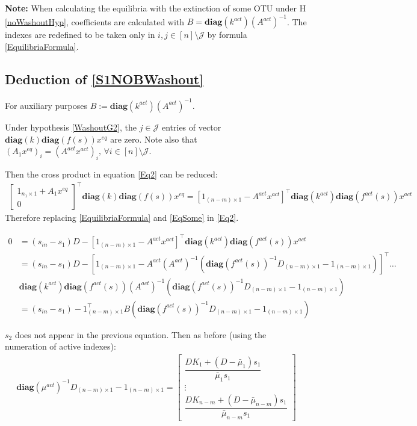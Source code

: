 \documentclass[3p,times]{article}
\newcommand{\diag}{\textbf{diag}}
\begin{document}
\textbf{Note:} When calculating the equilibria with the extinction of some OTU under H \ref{noWashoutHyp}, coefficients are calculated with $B = \diag(k^{act})(A^{act})^{-1}$. The indexes are redefined to be taken only in $i,j \in [n] \setminus \mathcal{J}$ by formula \eqref{EquilibriaFormula}.

\subsection{Deduction of \eqref{S1NOBWashout}}
For auxiliary purposes $B:= \diag(k^{act})(A^{act})^{-1}$. 

Under hypothesis \ref{WashoutG2}, the $j \in \mathcal{J}$ entries of vector $\diag(k) \diag(f(s))x^{eq} $ are zero. 
Note also that $(A_1x^{eq})_i = (A^{act}x^{act})_i, \, \forall i \in [n] \setminus \mathcal{J}$.

Then the cross product in equation \eqref{Eq2} can be reduced:
\begin{align} 
\begin{bmatrix}
1_{n_1\times 1}+A_1x^{eq} \\0
\end{bmatrix}^\top \diag(k) \diag(f(s))x^{eq} = [1_{(n-m)\times 1} - A^{act}x^{act}]^\top \diag(k^{act}) \diag(f^{act}(s))x^{act} 
\end{align} 
Therefore replacing \eqref{EquilibriaFormula} and \eqref{EqSome} in \eqref{Eq2}.

\begin{align}
0 &= (s_{in}-s_1)D- [1_{(n-m)\times 1} - A^{act}x^{act}]^\top \diag(k^{act}) \diag(f^{act}(s))x^{act}\\
&= (s_{in}-s_1)D- [1_{(n-m)\times 1} - A^{act}(A^{act})^{-1}(\diag(f^{act}(s))^{-1}D_{(n-m)\times 1} - 1_{(n-m)\times 1})]^\top \dots \\ & \diag(k^{act}) \diag(f^{act}(s))(A^{act})^{-1}(\diag(f^{act}(s))^{-1}D_{(n-m)\times 1} - 1_{(n-m)\times 1})\\
&  =  (s_{in}-s_1)-1_{(n-m)\times 1}^\top
B(\diag(f^{act}(s))^{-1}D_{(n-m)\times 1} - 1_{(n-m)\times 1})
\end{align} 


$s_2$ does not appear in the previous equation. Then as before (using the numeration of active indexes):
\begin{align}
\diag(\mu^{act})^{-1}D_{(n-m)\times 1} - 1_{(n-m)\times 1} = \begin{bmatrix}
\dfrac{DK_1+(D-\bar{\mu}_1)s_1}{\bar{\mu}_{1}s_1} \\ \vdots \\ \dfrac{DK_{n-m}+(D-\bar{\mu}_{n-m})s_1}{\bar{\mu}_{n-m}s_1}
\end{bmatrix}
\end{align}
\end{document}
